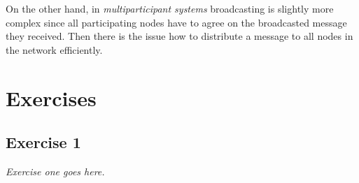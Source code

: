 On the other hand, in \emph{multiparticipant systems} broadcasting is slightly more complex since all participating nodes have to agree on the broadcasted message they received. Then there is the issue how to distribute a message to all nodes in the network efficiently.

\section{Exercises}
\label{sec:exercises}

\subsection*{Exercise 1}
\label{sec:exercise_1}

\emph{Exercise one goes here.}



